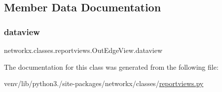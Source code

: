 \subsection{Member Data Documentation}
\mbox{\label{classnetworkx_1_1classes_1_1reportviews_1_1OutEdgeView_a14b81ea877724ba08f90ee82b469de7f}} 
\subsubsection{\texorpdfstring{dataview}{dataview}}
{\footnotesize\ttfamily networkx.\+classes.\+reportviews.\+Out\+Edge\+View.\+dataview\hspace{0.3cm}{\ttfamily [static]}}



The documentation for this class was generated from the following file\+:\begin{DoxyCompactItemize}
\item 
venv/lib/python3./site-\/packages/networkx/classes/\hyperlink{reportviews_8py}{reportviews.\+py}\end{DoxyCompactItemize}
